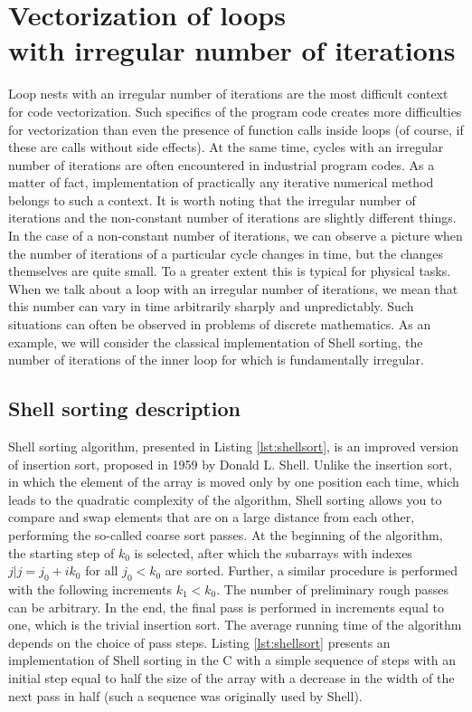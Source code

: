 \documentclass[
11pt,%
tightenlines,%
twoside,%
onecolumn,%
nofloats,%
nobibnotes,%
nofootinbib,%
superscriptaddress,%
noshowpacs,%
centertags]%
{revtex4}
\begin{document}
\section{Vectorization of loops \protect\\
with irregular number of iterations}

Loop nests with an irregular number of iterations are the most difficult context for code vectorization.
Such specifics of the program code creates more difficulties for vectorization than even the presence of function calls inside loops (of course, if these are calls without side effects).
At the same time, cycles with an irregular number of iterations are often encountered in industrial program codes.
As a matter of fact, implementation of practically any iterative numerical method belongs to such a context.
It is worth noting that the irregular number of iterations and the non-constant number of iterations are slightly different things.
In the case of a non-constant number of iterations, we can observe a picture when the number of iterations of a particular cycle changes in time, but the changes themselves are quite small.
To a greater extent this is typical for physical tasks.
When we talk about a loop with an irregular number of iterations, we mean that this number can vary in time arbitrarily sharply and unpredictably.
Such situations can often be observed in problems of discrete mathematics.
As an example, we will consider the classical implementation of Shell sorting, the number of iterations of the inner loop for which is fundamentally irregular.

\subsection{Shell sorting description}

Shell sorting algorithm, presented in Listing \ref{lst:shellsort}, is an improved version of insertion sort, proposed in 1959 by Donald L. Shell. 
Unlike the insertion sort, in which the element of the array is moved only by one position each time, which leads to the quadratic complexity of the algorithm, Shell sorting allows you to compare and swap elements that are on a large distance from each other, performing the so-called coarse sort passes. At the beginning of the algorithm, the starting step of $ k_0 $ is selected, after which the subarrays with indexes $ {j | j = j_0 + ik_0} $ for all $ j_0  < k_0 $ are sorted. 
Further, a similar procedure is performed with the following increments $ k_1  < k_0 $. 
The number of preliminary rough passes can be arbitrary. In the end, the final pass is performed in increments equal to one, which is the trivial insertion sort. 
The average running time of the algorithm depends on the choice of pass steps. 
Listing \ref{lst:shellsort} presents an implementation of Shell sorting in the C with a simple sequence of steps with an initial step equal to half the size of the array with a decrease in the width of the next pass in half (such a sequence was originally used by Shell). 
\end{document}
